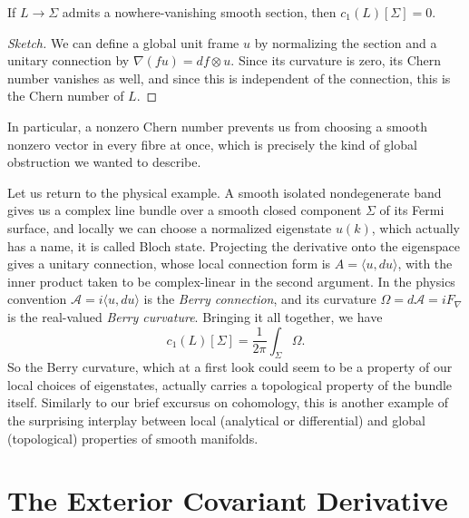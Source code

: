 \begin{proposition}
  If $L\to\Sigma$ admits a nowhere-vanishing smooth section, then $c_1(L)[\Sigma]=0$.
\end{proposition}
\begin{proof}[Sketch]
  We can define a global unit frame $u$ by normalizing the section and a unitary connection by $\nabla(fu)=df\otimes u$.
  Since its curvature is zero, its Chern number vanishes as well, and since this is independent of the connection, this is the Chern number of $L$.
\end{proof}
In particular, a nonzero Chern number prevents us from choosing a smooth nonzero vector in every fibre at once, which is precisely the kind of global obstruction we wanted to describe.

Let us return to the physical example. A smooth isolated nondegenerate band gives us a complex line bundle over a smooth closed component $\Sigma$ of its Fermi surface, and locally we can choose a normalized eigenstate $u(k)$, which actually has a name, it is called Bloch state. Projecting the derivative onto the eigenspace gives a unitary connection, whose local connection form is $A=\langle u,du\rangle$, with the inner product taken to be complex-linear in the second argument.
In the physics convention $\mathcal{A}=i\langle u,du\rangle$ is the \emph{Berry connection}, and its curvature $\Omega=d\mathcal{A}=iF_\nabla$ is the real-valued \emph{Berry curvature}. Bringing it all together, we have
\begin{equation}
  c_1(L)[\Sigma]=\frac{1}{2\pi}\int_\Sigma\Omega.
\end{equation}
So the Berry curvature, which at a first look could seem to be a property of our local choices of eigenstates, actually carries a topological property of the bundle itself. Similarly to our brief excursus on cohomology, this is another example of the surprising interplay between local (analytical or differential) and global (topological) properties of smooth manifolds.

\section{The Exterior Covariant Derivative}

